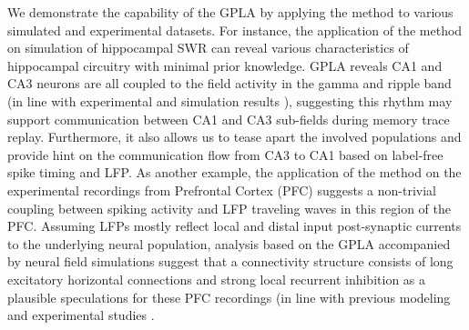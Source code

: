We demonstrate the capability of the GPLA by applying the method to various simulated and experimental datasets.
For instance, the application of the method on simulation of hippocampal SWR can reveal various characteristics of hippocampal circuitry with minimal prior knowledge.
GPLA reveals CA1 and CA3 neurons are all coupled to the field activity in the gamma and ripple band
(in line with experimental and simulation results
\cite{buzsakiHighfrequencyNetworkOscillation1992,ramirez-villegasDissectingSynapseFrequencyDependent2018}),
suggesting this rhythm may support communication between CA1 and CA3 sub-fields during memory trace replay. 
Furthermore, it also allows us to tease apart the involved populations and provide hint on the communication flow from CA3 to CA1 based on label-free spike timing and LFP.
As another example, the application of the method on the experimental recordings from Prefrontal Cortex (PFC) suggests a non-trivial coupling between spiking activity and LFP traveling waves in this region of the PFC.
Assuming LFPs mostly reflect local and distal input post-synaptic currents to the underlying neural population,
analysis based on the GPLA accompanied by neural field simulations suggest that a connectivity structure consists of long excitatory horizontal connections and strong local recurrent inhibition as a plausible speculations for these PFC recordings
(in line with previous modeling and experimental studies \cite{safaviNonmonotonicSpatialStructure2018,sherfeyFlexibleResonancePrefrontal2018,sherfeyPrefrontalOscillationsModulate2020a}.

